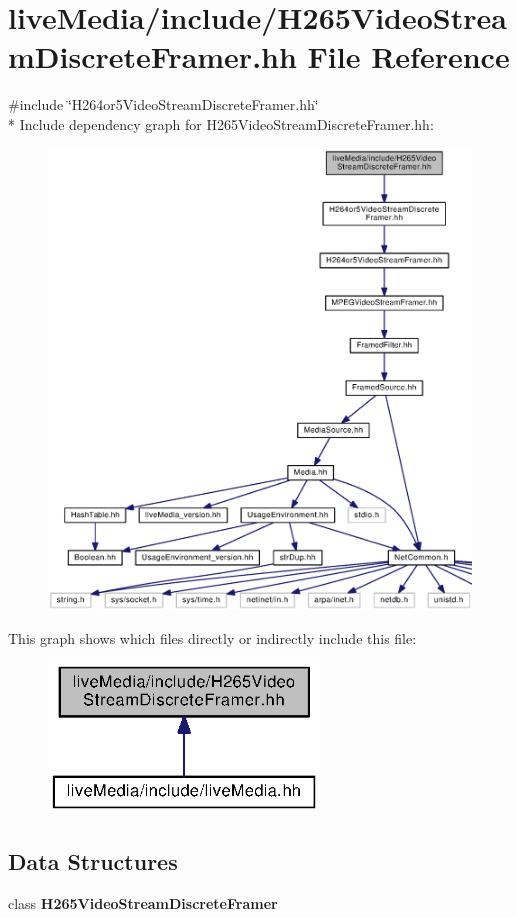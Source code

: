 \section{live\+Media/include/\+H265\+Video\+Stream\+Discrete\+Framer.hh File Reference}
\label{H265VideoStreamDiscreteFramer_8hh}
{\ttfamily \#include \char`\"{}H264or5\+Video\+Stream\+Discrete\+Framer.\+hh\char`\"{}}\\*
Include dependency graph for H265\+Video\+Stream\+Discrete\+Framer.\+hh\+:
\nopagebreak
\begin{figure}[H]
\begin{center}
\leavevmode
\includegraphics[width=350pt]{H265VideoStreamDiscreteFramer_8hh__incl}
\end{center}
\end{figure}
This graph shows which files directly or indirectly include this file\+:
\nopagebreak
\begin{figure}[H]
\begin{center}
\leavevmode
\includegraphics[width=204pt]{H265VideoStreamDiscreteFramer_8hh__dep__incl}
\end{center}
\end{figure}
\subsection*{Data Structures}
\begin{DoxyCompactItemize}
\item 
class {\bf H265\+Video\+Stream\+Discrete\+Framer}
\end{DoxyCompactItemize}
